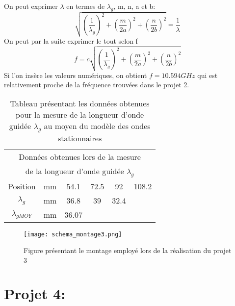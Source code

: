 On peut exprimer $\lambda$ en termes de $\lambda_g$, m, n, a et b:
\begin{equation}
\sqrt{\left(\frac{1}{\lambda_g}\right)^2 + \left(\frac{m}{2a}\right)^2  + \left(\frac{n}{2b}\right)^2} = \frac{1}{\lambda}
\end{equation}
On peut par la suite exprimer le tout selon f
\begin{equation}
f = c\sqrt{\left(\frac{1}{\lambda_g}\right)^2 + \left(\frac{m}{2a}\right)^2  +  \left(\frac{n}{2b}\right)^2}
\end{equation}
Si l'on insère les valeurs numériques, on obtient $f = 10.594GHz$ qui est relativement proche de la fréquence trouvées dans le projet 2.

\begin{table}[htbp]
  \centering
    \begin{tabular}{|c|c|cccc|}
    \multicolumn{6}{c}{Données obtenues lors de la mesure}\\
    \multicolumn{6}{c}{ de la longueur d'onde guidée $\lambda_g$} \\\hline
    Position & mm    & 54.1  & 72.5  & 92    & 108.2 \\\hline
    $\lambda_g$ & mm    & 36.8  & 39    & 32.4  &  \\\hline
    $\lambda_{gMOY}$ & mm    & 36.07 &       &       &  \\\hline
    \end{tabular}%
  \caption{Tableau présentant les données obtenues pour la mesure de la longueur d'onde guidée $\lambda_g$ au moyen du modèle des ondes stationnaires}
  \label{tab:1}%
\end{table}%
\begin{figure}
\centering
\texttt{[image: schema\_montage3.png]}
\caption{Figure présentant le montage employé lors de la réalisation du projet 3}
\label{fig:5}
\end{figure}

\section{Projet 4: }